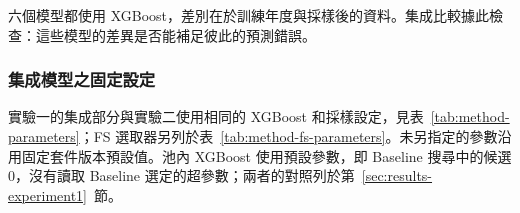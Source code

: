 六個模型都使用 XGBoost，差別在於訓練年度與採樣後的資料。集成比較據此檢查：這些模型的差異是否能補足彼此的預測錯誤。

\subsubsection{集成模型之固定設定}

實驗一的集成部分與實驗二使用相同的 XGBoost 和採樣設定，見表~\ref{tab:method-parameters}；FS 選取器另列於表~\ref{tab:method-fs-parameters}。未另指定的參數沿用固定套件版本預設值。池內 XGBoost 使用預設參數，即 Baseline 搜尋中的候選 0，沒有讀取 Baseline 選定的超參數；兩者的對照列於第~\ref{sec:results-experiment1}~節。

\begingroup
\footnotesize
{}
\setlength{\tabcolsep}{4pt}
\renewcommand{\arraystretch}{1.25}
\setlength{\LTleft}{0pt plus 1fill}
\setlength{\LTright}{0pt plus 1fill}
